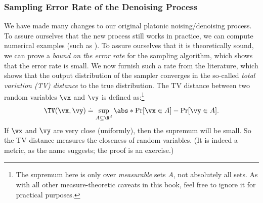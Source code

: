 \documentclass[../../book-main.tex]{subfiles}
\begin{document}
\subsubsection{Sampling Error Rate of the Denoising Process}
We have made many changes to our original platonic noising/denoising
process. To assure ourselves that the new process still works in
practice, we can compute numerical examples (such as
). To assure ourselves that it is
theoretically sound, we can prove a \textit{bound on the error rate}
for the sampling algorithm, which shows that the error rate is small.
We now furnish such a rate from the literature, which shows that the
output distribution of the sampler converges in the so-called
\textit{total variation (TV) distance} to the true distribution. The
TV distance between two random variables \(\vx\) and
\(\vy\) is defined as:\footnote{The supremum here is only over
    \textit{measurable} sets \(A\), not absolutely all sets. As with all
    other measure-theoretic caveats in this book, feel free to
ignore it for practical purposes.}
\begin{equation}
    \TV(\vx, \vy) \doteq \sup_{A \subseteq \R^{d}}\abs*{\Pr[\vx \in
    A] - \Pr[\vy \in A]}.
\end{equation}
If \(\vx\) and \(\vy\) are very close (uniformly), then the supremum
will be small. So the TV distance measures the closeness of random
variables. (It is indeed a metric, as the name suggests; the proof is
an exercise.)
\end{document}
